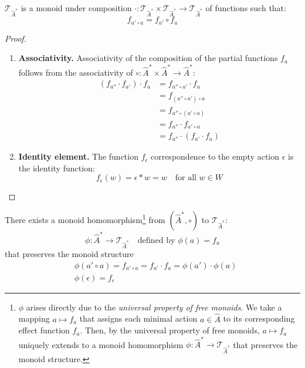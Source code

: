 \begin{proposition}\label{prp:T_is_monoid}
	$\mathcal{T}_{\hat{A}^{\ast}}$ is a monoid under composition $\cdot: \mathcal{T}_{\hat{A}^{\ast}} \times \mathcal{T}_{\hat{A}^{\ast}} \to \mathcal{T}_{\hat{A}^{\ast}}$ of functions such that:
	\begin{equation}
		f_{a' \circ a} = f_{a'} \circ f_{a}
	\end{equation}
\end{proposition}
\begin{proof}
	\begin{enumerate}[(1)]
		\item \textbf{Associativity.}
		      Associativity of the composition of the partial functions $f_{a}$ follows from the associativity of $\circ: \hat{A}^{\ast} \times \hat{A}^{\ast} \to \hat{A}^{\ast}$:
		      \begin{align}
			      (f_{a''} \cdot f_{a'}) \cdot f_{a} & = f_{a'' \circ a'} \cdot f_{a}       \\
			                                         & = f_{(a'' \circ a') \circ a}         \\
			                                         & = f_{a'' \circ (a' \circ a)}         \\
			                                         & = f_{a''} \cdot f_{a' \circ a}       \\
			                                         & = f_{a''} \cdot (f_{a'} \cdot f_{a})
		      \end{align}
		\item \textbf{Identity element.}
		      The function $f_{\epsilon}$ correspondence to the empty action $\epsilon$ is the identity function:
		      \begin{equation}
			      f_{\epsilon}(w) = \epsilon \ast w = w \quad \text{for all $w \in W$}
		      \end{equation}
	\end{enumerate}
\end{proof}

There exists a monoid homomorphism\footnote{
$\phi$ arises directly due to the \emph{universal property of free monoids}.
We take a mapping $a \mapsto f_{a}$ that assigns each minimal action $a \in \hat{A}$ to its corresponding effect function $f_{a}$.
Then, by the universal property of free monoids, $a \mapsto f_{a}$ uniquely extends to a monoid homomorphism $\phi : \hat{A}^{\ast} \to \mathcal{T}_{\hat{A}^{\ast}}$ that preserves the monoid structure.
} from $(\hat{A}^{\ast}, \circ)$ to $\mathcal{T}_{\hat{A}^{\ast}}$:
\begin{equation}
	\phi : \hat{A}^{\ast} \to \mathcal{T}_{\hat{A}^{\ast}} \quad\text{defined by $\phi(a) = f_{a}$}
\end{equation}
that preserves the monoid structure
\begin{align}
	 & \phi(a' \circ a) = f_{a' \circ a} = f_{a'} \cdot f_{a} = \phi(a') \cdot \phi(a) \\
	 & \phi(\epsilon) = f_{\epsilon}
\end{align}

